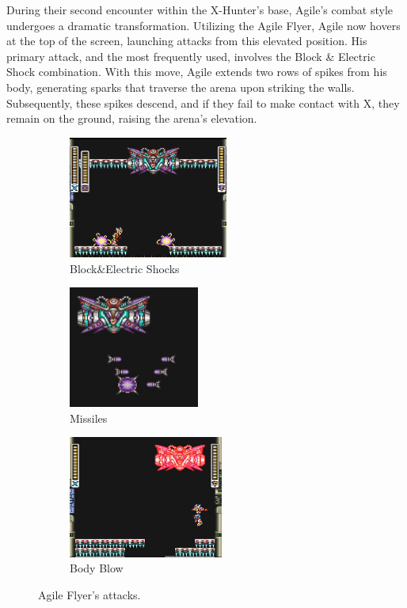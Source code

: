 During their second encounter within the X-Hunter's base, Agile's combat style undergoes a dramatic transformation. Utilizing the Agile Flyer, Agile now hovers at the top of the screen, launching attacks from this elevated position. His primary attack, and the most frequently used, involves the Block \& Electric Shock combination. With this move, Agile extends two rows of spikes from his body, generating sparks that traverse the arena upon striking the walls. Subsequently, these spikes descend, and if they fail to make contact with X, they remain on the ground, raising the arena's elevation.
\begin{figure}[htp]
	\centering
	\begin{subfigure}{\linewidth}
	\centering
	\includegraphics[height=4cm]{figures/X2/Hunter_stages/Agile_flyer_spike_shock.png}
	\caption{Block\&Electric Shocks}
	\end{subfigure}	
	\begin{subfigure}{0.45\linewidth}
		\centering
		\includegraphics[height=4cm]{figures/X2/Hunter_stages/Agile_flyer_missile.png}
		\caption{Missiles}
	\end{subfigure}
		\begin{subfigure}{.45\linewidth}
		\centering
		\includegraphics[height=4cm]{figures/X2/Hunter_stages/Agile_flyer_dash.jpg}
		\caption{Body Blow}	
	\end{subfigure}
	\caption{Agile Flyer's attacks.}	
\end{figure}
